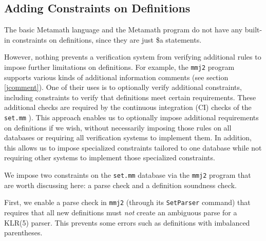 \subsection{Adding Constraints on Definitions}

The basic Metamath language and the Metamath program do
not have any built-in constraints on definitions, since they are just
\$a statements.

However, nothing prevents a verification system from verifying
additional rules to impose further limitations on definitions.
For example, the \texttt{mmj2} program
supports various kinds of 
additional information comments (see section \ref{jcomment}).
One of their uses is to optionally verify additional constraints,
including constraints to verify that definitions meet certain
requirements.
These additional checks are required by the continuous integration (CI)
checks of the
\texttt{set.mm}%
).
This approach enables us to optionally impose additional requirements
on definitions if we wish, without necessarily imposing those rules on
all databases or requiring all verification systems to implement them.
In addition, this allows us to impose specialized constraints tailored
to one database while not requiring other systems to implement
those specialized constraints.

We impose two constraints on the
\texttt{set.mm}%
 database
via the \texttt{mmj2} program that are worth discussing here:
a parse check and a definition soundness check.

% 

First,
we enable a parse check in \texttt{mmj2} (through its
\texttt{SetParser} command) that requires that all new definitions
must \textit{not} create an ambiguous parse for a KLR(5) parser.
This prevents some errors such as definitions with imbalanced parentheses.

